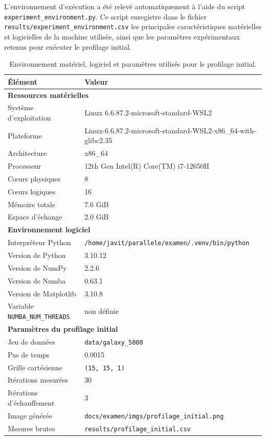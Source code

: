 \documentclass[11pt,a4paper]{article}
\begin{document}
L'environnement d'exécution a été relevé automatiquement à l'aide du script \texttt{experiment\_environment.py}. Ce script enregistre dans le fichier \texttt{results/experiment\_environment.csv} les principales caractéristiques matérielles et logicielles de la machine utilisée, ainsi que les paramètres expérimentaux retenus pour exécuter le profilage initial.

\begin{table}[H]
    \centering
    \caption{Environnement matériel, logiciel et paramètres utilisés pour le profilage initial.}
    \begin{tabularx}{\textwidth}{lX}
        \toprule
        Élément & Valeur \\
        \midrule
        \multicolumn{2}{l}{\textbf{Ressources matérielles}} \\
        Système d'exploitation & Linux 6.6.87.2-microsoft-standard-WSL2 \\
        Plateforme & Linux-6.6.87.2-microsoft-standard-WSL2-x86\_64-with-glibc2.35 \\
        Architecture & x86\_64 \\
        Processeur & 12th Gen Intel(R) Core(TM) i7-12650H \\
        Cœurs physiques & 8 \\
        Cœurs logiques & 16 \\
        Mémoire totale & 7.6 GiB \\
        Espace d'échange & 2.0 GiB \\
        \midrule
        \multicolumn{2}{l}{\textbf{Environnement logiciel}} \\
        Interpréteur Python & \texttt{/home/javit/parallele/examen/.venv/bin/python} \\
        Version de Python & 3.10.12 \\
        Version de NumPy & 2.2.6 \\
        Version de Numba & 0.63.1 \\
        Version de Matplotlib & 3.10.8 \\
        Variable \texttt{NUMBA\_NUM\_THREADS} & non définie \\
        \midrule
        \multicolumn{2}{l}{\textbf{Paramètres du profilage initial}} \\
        Jeu de données & \texttt{data/galaxy\_5000} \\
        Pas de temps & 0.0015 \\
        Grille cartésienne & \texttt{(15, 15, 1)} \\
        Itérations mesurées & 30 \\
        Itérations d'échauffement & 3 \\
        Image générée & \texttt{docs/examen/imgs/profilage\_initial.png} \\
        Mesures brutes & \texttt{results/profilage\_initial.csv} \\
        \bottomrule
    \end{tabularx}
\end{table}
\end{document}
